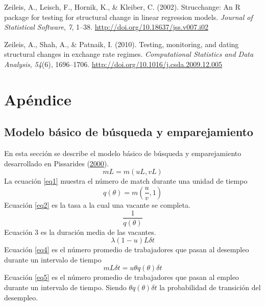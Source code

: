 \documentclass[12pt,oneside]{reedthesis}
\begin{document}
\leavevmode\hypertarget{ref-Zeileis2002}{}%
Zeileis, A., Leisch, F., Hornik, K., \& Kleiber, C. (2002). Strucchange: An R package for testing for structural change in linear regression models. \emph{Journal of Statistical Software}, \emph{7}, 1--38. \url{http://doi.org/10.18637/jss.v007.i02}

\leavevmode\hypertarget{ref-Zeileis2010}{}%
Zeileis, A., Shah, A., \& Patnaik, I. (2010). Testing, monitoring, and dating structural changes in exchange rate regimes. \emph{Computational Statistics and Data Analysis}, \emph{54}(6), 1696--1706. \url{http://doi.org/10.1016/j.csda.2009.12.005}

\appendix

\setlength{\parindent}{0.20in}
\setlength{\leftskip}{-0.20in}
\setlength{\parskip}{8pt}

\hypertarget{apuxe9ndice}{%
\chapter{Apéndice}\label{apuxe9ndice}}

\hypertarget{modelo-buxe1sico-de-buxfasqueda-y-emparejamiento}{%
\section{Modelo básico de búsqueda y emparejamiento}\label{modelo-buxe1sico-de-buxfasqueda-y-emparejamiento}}

En esta sección se describe el modelo básico de búsqueda y emparejamiento desarrollado en Pissarides (\protect\hyperlink{ref-Pissarides2000}{2000}).
\begin{equation} \label{eq1}
mL = m(uL, vL)
\end{equation}
La ecuación \eqref{eq1} muestra el número de match durante una unidad de tiempo
\begin{equation} \label{eq2}
q(\theta) = m(\frac{u}{v}, 1)
\end{equation}
Ecuación \eqref{eq2} es la tasa a la cual una vacante se completa.
\begin{equation} \label{eq3}
\frac{1}{q(\theta)}
\end{equation}
Ecuación 3 es la duración media de las vacantes.
\begin{equation} \label{eq4}
\lambda(1-u)L\delta t
\end{equation}
Ecuación \eqref{eq4} es el número promedio de trabajadores que pasan al desempleo durante un intervalo de tiempo
\begin{equation} \label{eq5}
mL\delta t = u\theta q(\theta)\delta t
\end{equation}
Ecuación \eqref{eq5} es el número promedio de trabajadores que pasan al empleo durante un intervalo de tiempo. Siendo \(\theta q(\theta)\delta t\) la probabilidad de transición del desempleo.
\end{document}
